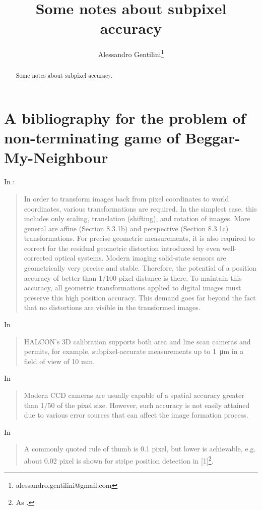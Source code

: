 \documentclass[a4paper,12pt]{article}
\title{Some notes about subpixel accuracy}
\author{Alessandro Gentilini\thanks{alessandro.gentilini@gmail.com}}
\begin{document}
\maketitle

\begin{abstract}
Some notes about subpixel accuracy.
\end{abstract} 

\section{A bibliography for the problem of non-terminating game of 
Beggar-My-Neighbour}

In \cite[section 8.2, p.270]{Jahne:2004:PHI:983100}:
\begin{quotation}
In order to transform images back from pixel coordinates to world coordinates,
various transformations are required. In the simplest case, this
includes only scaling,
translation (shifting), and rotation of images. More general are
affine (Section 8.3.1b)
and perspective (Section 8.3.1c) transformations. For precise
geometric measurements,
it is also required to correct for the residual geometric distortion
introduced by even
well-corrected optical systems. Modern imaging solid-state sensors are
geometrically
very precise and stable. Therefore, the potential of a position
accuracy of better than
1/100 pixel distance is there. To maintain this accuracy, all
geometric transformations
applied to digital images must preserve this high position accuracy.
This demand goes
far beyond the fact that no distortions are visible in the transformed images.
\end{quotation}

In \cite{halcon}
\begin{quotation}
HALCON’s 3D calibration supports both area and line scan cameras and
permits, for example, subpixel-accurate measurements up to \SI{1}{\micro\metre} in a field of
view of 10 mm.
\end{quotation}

In \cite{Heikkila:2000:GCC:354167.354171}
\begin{quotation}
Modern CCD cameras are usually capable of a spatial accuracy greater than 1/50 of the pixel
size. However, such accuracy is not easily attained due to various error sources that can affect
the image formation process.
\end{quotation}

In \cite{Fisher}
\begin{quotation}
A commonly quoted rule of thumb is 0.1 pixel, but lower is achievable, e.g. about 0.02 pixel is shown for stripe position detection in [1]\footnote{As \cite{doi:10.1117/12.55947}.}.
\end{quotation}
\end{document}
